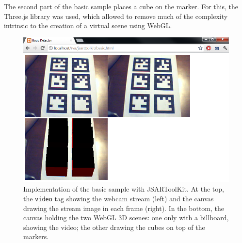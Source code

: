 The second part of the basic sample places a cube on the marker. For this, the Three.js library was used, which allowed to remove much of the complexity intrinsic to the creation of a virtual scene using WebGL.

\begin{figure}[p]
	\begin{center}
		\includegraphics[width=\columnwidth]{report/images/basic.png}
	\end{center}
	\caption[Basic Sample]{Implementation of the basic sample with JSARToolKit. At the top, the \texttt{video} tag showing the webcam stream (left) and the canvas drawing the stream image in each frame (right). In the bottom, the canvas holding the two WebGL 3D scenes: one only with a billboard, showing the video; the other drawing the cubes on top of the markers.}
	\label{fig:basic}
\end{figure}
